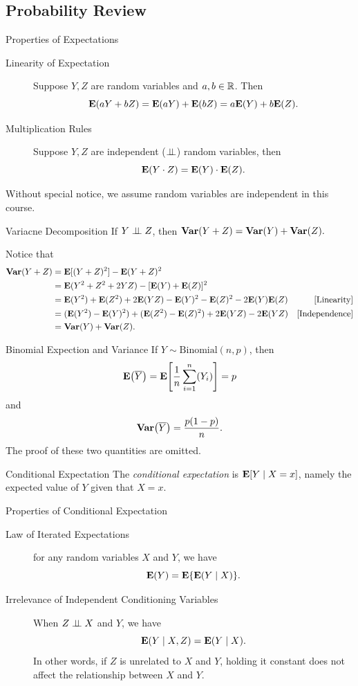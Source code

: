 \subsection{Probability Review}
\begin{thm}{Properties of Expectations}
	\begin{description}
		\item[Linearity of Expectation] Suppose $Y,Z$ are random variables and $a,b\in\mathbb{R}$. Then \[\vb{E}(aY+bZ)= \vb{E}(aY)+\vb{E}(bZ)=a\vb{E}(Y)+b\vb{E}(Z).\] 
     	\item[Multiplication Rules] Suppose $Y,Z$ are independent ($\perp\!\!\!\perp$) random variables, then \[\vb{E}(Y\cdot Z)=\vb{E}(Y)\cdot\vb{E}(Z).\]
	\end{description}
\end{thm}
\begin{rmk}
	Without special notice, we assume random variables are independent in this course.	
\end{rmk}
\begin{thm}{Variacne Decomposition}
	If $Y\perp\!\!\!\perp Z$, then $\vb{Var}(Y+Z)=\vb{Var}(Y)+\vb{Var}(Z).$	
\end{thm}
\begin{prf}
	Notice that  \begin{align*}\vb{Var}(Y+Z)&=\vb{E}[(Y+Z)^2]- \vb{E}(Y+Z)^2\\&=\vb{E}(Y^2+Z^2+2YZ)-[\vb{E}(Y)+\vb{E}(Z)]^2 \\
    &=\vb{E}(Y^2)+\vb{E}(Z^2)+2\vb{E}(YZ)-\vb{E}(Y)^2-\vb{E}(Z)^2-2\vb{E}(Y)\vb{E}(Z)&[\text{Linearity}]\\&=(\vb{E}(Y^2)-\vb{E}(Y)^2)+(\vb{E}(Z^2)-\vb{E}(Z)^2)+2\vb{E}(YZ)-2\vb{E}(YZ)&[\text{Independence}]\\&=\vb{Var}(Y)+\vb{Var}(Z).\end{align*}
\end{prf}
\begin{thm}{Binomial Expection and Variance}
	If $Y\sim\text{Binomial}(n,p)$, then \[\vb{E}\qty(\overline{Y})= \vb{E}\qty[\dfrac{1}{n}\sum_{i=1}^n(Y_i)]=p\] and \[\vb{Var}\qty(\overline{Y})=\dfrac{p(1-p)}{n}.\] The proof of these two quantities are omitted. 
\end{thm}
\begin{df}{Conditional Expectation}
    The \textit{conditional expectation} is $\vb{E}[Y\mid X=x]$, namely the expected value of $Y$ given that $X=x$.
\end{df}
\begin{thm}{Properties of Conditional Expectation}
	\begin{description}
		\item[Law of Iterated Expectations] for any random variables $X$ and $Y$, we have \[\vb{E}(Y)=\vb{E}\qty{\vb{E}(Y\mid X)}.\]
		\item[Irrelevance of Independent Conditioning Variables] When $Z\perp\!\!\!\perp X$ and $Y$, we have \[\vb{E}(Y\mid X,Z)=\vb{E}(Y\mid X).\] In other words, if $Z$ is unrelated to $X$ and $Y$, holding it constant does not affect the relationship between $X$ and $Y$.
	\end{description}
\end{thm}

